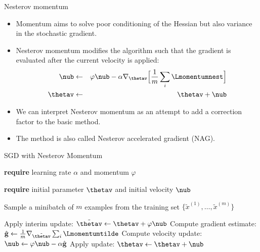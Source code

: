 \begin{vbframe}{Nesterov momentum}
  \begin{itemize}
    \item Momentum aims to solve poor conditioning of the Hessian but also variance in the stochastic gradient.
    \item Nesterov momentum modifies the algorithm such that the gradient is evaluated after the current velocity is applied:
      \begin{eqnarray*} 
        \nub &\leftarrow& \varphi \nub - \alpha \nabla_{\thetav} \Big[\frac{1}{m} \sum_{i} \Lmomentumnest \Big] \\
        \thetav &\leftarrow& \thetav + \nub
      \end{eqnarray*}
    \item We can interpret Nesterov momentum as an attempt to add a correction factor to the basic method.
    \item The method is also called Nesterov accelerated gradient (NAG).
  \end{itemize}
\end{vbframe}

\begin{vbframe}{SGD with Nesterov Momentum}
  \begin{algorithm}[H]
  \small
    \caption{Stochastic gradient descent with Nesterov momentum}
    \begin{algorithmic}[1]
    \State \textbf{require} learning rate $\alpha$ and momentum $\varphi$ \strut
    \State \textbf{require} initial parameter $\thetav$ and initial velocity $\nub$ \strut
        \State \parbox[t]{\dimexpr\linewidth-\algorithmicindent}{Sample a minibatch of $m$ examples from the training set $\{\tilde{x}^{(1)},\dots,\tilde{x}^{(m)}\}$}
        \State Apply interim update: $\tilde{\thetav} \leftarrow \thetav + \varphi \nub$
        \State Compute gradient estimate: $\hat{\mathbf{g}} \leftarrow  \frac{1}{m} \nabla_{\tilde{\thetav}} \sum_{i} \Lmomentumtilde$
        \State Compute velocity update: $\nub \leftarrow \varphi \nub - \alpha \hat{\mathbf{g}}$
        \State Apply update: $\thetav \leftarrow \thetav + \nub$
      \EndWhile
    \end{algorithmic}
  \end{algorithm}
\end{vbframe}


